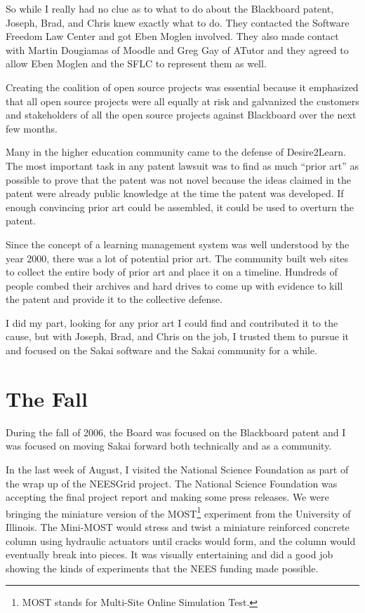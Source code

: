 \documentclass[12pt]{book}
\begin{document}
So while I really had no clue as to what to do about the
Blackboard patent, Joseph, Brad, and Chris knew exactly what
to do.  They contacted the Software Freedom Law Center
and got Eben Moglen involved.  They also made contact with
Martin Dougiamas of Moodle and Greg Gay of ATutor and they
agreed to allow Eben Moglen and the SFLC to represent them
as well.

Creating the coalition of open source projects was essential
because it emphasized that all open source projects were all
equally at risk
and galvanized the customers and stakeholders of all the
open source projects against Blackboard over the next few
months.

Many in the higher education community came to the defense
of Desire2Learn.  The most important task in any patent
lawsuit was to find as much ``prior art'' as possible
to prove that the patent was not novel because the ideas
claimed in the patent were already public knowledge
at the time the patent was developed.  If enough
convincing prior art could be assembled, it could be
used to overturn the patent.

Since the concept of a learning management system
was well understood by the year 2000, there was
a lot of potential prior art.   The
community built web sites
to collect the entire body of prior art and place it on
a timeline.  Hundreds of people combed their archives
and hard drives to come up with evidence to kill
the patent and provide it to the collective defense.

I did my part, looking for any prior art
I could find and contributed it to the cause,
but with Joseph, Brad, and Chris on the job,
I trusted them to pursue it and focused on the
Sakai software and the Sakai community for a while.

\chapter{The Fall}

During the fall of 2006, the Board was focused
on the Blackboard patent and I was focused on moving
Sakai forward both technically and as a community.


In the last week of August, I visited the National
Science Foundation as part of the wrap up of the
NEESGrid project.   The National Science Foundation
was accepting the final project report and making
some press releases.   We were bringing the miniature
version of the MOST\footnote{MOST stands for Multi-Site
Online Simulation Test.} experiment from the University
of Illinois.   The Mini-MOST would stress and twist
a miniature reinforced concrete column
using hydraulic actuators
until cracks
would form, and the column would eventually break
into pieces.  It was visually entertaining
and did a good job showing the kinds of experiments
that the NEES funding made possible.
\end{document}
